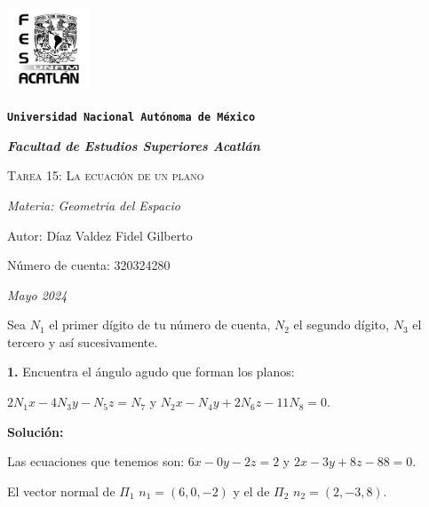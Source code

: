 \documentclass{article}
\begin{document}
\begin{titlepage}
    \centering   
    {\includegraphics[width=2.5cm]{logo.png}\par}
    {\texttt{\bfseries \LARGE Universidad Nacional Autónoma de México} \par}
    \vspace{1cm}
    {\itshape \Large \bfseries Facultad de Estudios Superiores Acatlán \par}
    \vspace{3cm}
    {\scshape \Huge Tarea 15: La ecuación de un plano\par}
    \vspace {3cm}
    {\slshape \Large Materia: Geometria del Espacio \par}
    \vspace{2cm}
    {\Large Autor: Díaz Valdez Fidel Gilberto\par}
    {\Large Número de cuenta: 320324280\par}
    \vfill
    {\itshape Mayo 2024 \par}
\end{titlepage}
Sea $N_1$ el primer dígito de tu número de cuenta, $N_2$ el segundo dígito, $N_3$ el tercero y así
sucesivamente.
\vspace{10pt}

\textbf{1.} Encuentra el ángulo agudo que forman los planos:
\vspace{10pt}
\begin{center}
    \begin{minipage}[c]{10cm}
        $2N_1x-4N_3y-N_5z=N_7$ y $N_2x-N_4y+2N_6z-11N_8 =0$.
    \end{minipage}    
\end{center}
\vspace{10pt}

\textbf{Solución:}
\vspace{10pt}

Las ecuaciones que tenemos son: $6x-0y-2z=2$ y $2x-3y+8z-88=0$.

El vector normal de $\Pi_1$ $n_1=(6,0,-2)$ y el de $\Pi_2$ $n_2=(2,-3,8)$. 
\vspace*{10pt}
\end{document}
